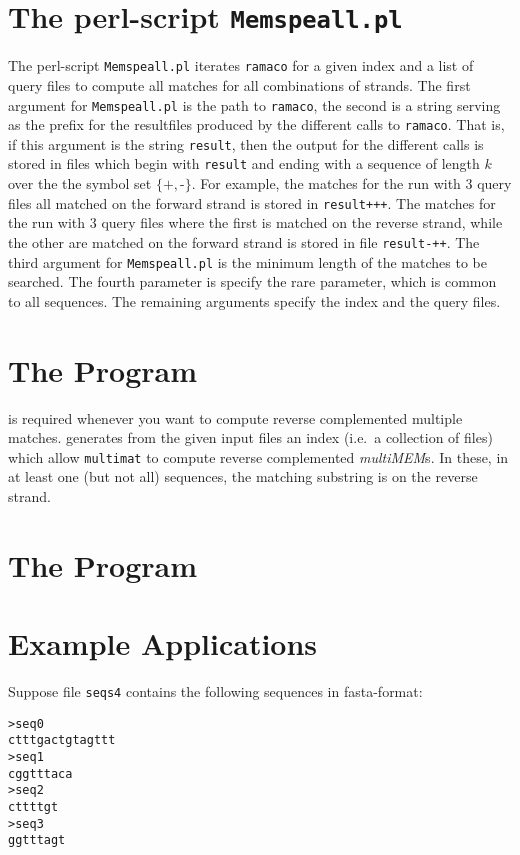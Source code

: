 \documentclass[12pt]{article}
\makeatletter
\newcommand{\MM}{\texttt{multimat}\xspace}
\newcommand{\SEMM}{\texttt{ramaco}\xspace}
\newcommand{\MEMSPEall}{\texttt{Memspeall.pl}\xspace}
\newcommand{\MMEM}[0]{\textit{multiMEM}\xspace}
\newcommand{\Filename}[1]{\texttt{\small #1}\index{#1@\texttt{#1}}}
\newenvironment{LargeOutput}{%
 \begin{footnotesize}
 \begin{alltt}}{%
 \end{alltt}
 \end{footnotesize}%
 \addvspace{-\medskipamount}
}
\makeatother
\begin{document}
\section{The perl-script \MEMSPEall}\label{MEMSPEallsection}
The perl-script \MEMSPEall iterates \SEMM for a given index and a 
list of query files to compute all matches for all combinations
of strands. The first argument for \MEMSPEall is 
the path to \SEMM, the second is a string serving as the prefix
for the resultfiles produced by the different calls to 
\SEMM. That is, if this argument is the string \texttt{result},
then the output for the different calls is stored in
files which begin with \texttt{result} and ending with a 
sequence of length \(k\) over the the symbol set \(\{\texttt{+},\texttt{-}\}\).
For example, the matches for the run with 3 query files all matched on the
forward strand is stored in \texttt{result+++}. The matches for the run with 3
query files where the first is matched on the reverse strand, while
the other are matched on the forward strand is stored in file
\texttt{result-++}. The third argument for \MEMSPEall is the minimum length
of the matches to be searched. The fourth parameter is specify the 
rare parameter, which is common to all sequences. The remaining arguments
specify the index and the query files.

\section{The Program \MKRC}
\MKRC is required whenever you want to compute reverse complemented
multiple matches. \MKRC generates from the given input
files an index (i.e.\ a collection of files) which allow \MM to compute
reverse complemented \MMEM{s}. In these, in at least one (but not all) 
sequences, the matching substring is on the reverse strand. 


\section{The Program \MKDNASIX}\label{MKDNASIXSECTION}


\section{Example Applications}\label{Applications}
Suppose file \Filename{seqs4} contains the following sequences in fasta-format:

\begin{LargeOutput}
>seq0
ctttgactgtagttt
>seq1
cggtttaca
>seq2
cttttgt
>seq3
ggtttagt
\end{LargeOutput}
\end{document}

